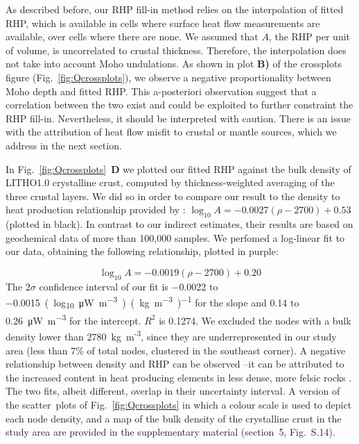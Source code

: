 {As described before, our RHP fill-in method relies on the interpolation of fitted RHP, which is available in cells where surface heat flow measurements are available, over cells where there are none.
We assumed that $A$, the RHP per unit of volume, is uncorrelated to crustal thickness.
Therefore, the interpolation does not take into account Moho undulations.
As shown in plot \textbf{B)} of the crossplots figure (Fig.~\ref{fig:Qcrossplots}), we observe a negative proportionality between Moho depth and fitted RHP.
This a-posteriori observation suggest that a correlation between the two exist and could be exploited to further constraint the RHP fill-in.
Nevertheless, it should be interpreted with caution.
There is an issue with the attribution of heat flow misfit to crustal or mantle sources, which we address in the next section.

In Fig.~\ref{fig:Qcrossplots}~\textbf{D} we plotted our fitted RHP against the bulk density of LITHO1.0 \parencite{Pasyanos2014} crystalline crust, computed by thickness-weighted averaging of the three crustal layers.
We did so in order to compare our result to the density to heat production relationship provided by \textcite{Hasterok2017_ign}: $\log_{10} A = -0.0027 (\rho - 2700) + 0.53 $ (plotted in black).
In contrast to our indirect estimates, their results are based on geochemical data of more than {100,000} samples.
We perfomed a log-linear fit to our data, obtaining the following relationship, plotted in purple:

\begin{equation}
	\label{eq:RHP_RHO_fit}
	\log_{10} A = -0.0019 (\rho - 2700) + 0.20
\end{equation}
The $2\sigma$ confidence interval of our fit is \num{-0.0022} to \SI{-0.0015}{(log_{10} \micro \watt \per \cubic \metre)(\kilo \gram \per \cubic \metre)^{-1}} for the slope and \num{0.14} to \SI{0.26}{\micro \watt \per \cubic \metre} for the intercept.
$R^2$ is \num{0.1274}.
We excluded the nodes with a bulk density lower than 2780~{kg~m\textsuperscript{-3}}, since they are underrepresented in our study area (less than 7\% of total nodes, clustered in the southeast corner).
A negative relationship between density and RHP can be observed --it can be attributed to the increased content in heat producing elements in less dense, more felsic rocks \parencite{Hasterok2017_ign}.
The two fits, albeit different, overlap in their uncertainty interval.
A version of the scatter~plots of Fig.~\ref{fig:Qcrossplots} in which a colour scale is used to depict each node density, and a map of the bulk density of the crystalline crust in the study area are provided in the supplementary material (section~5, Fig.~S.14).

}
